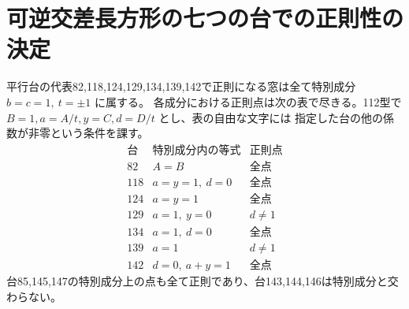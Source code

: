 \section{可逆交差長方形の七つの台での正則性の決定}
\label{sec:parallel-support-fibers}
\begin{theorem}\label{thm:parallel-support-fibers}
平行台の代表82,118,124,129,134,139,142で正則になる窓は全て特別成分 $b=c=1,\ t=\pm1$ に属する。
各成分における正則点は次の表で尽きる。112型で $B=1,a=A/t,y=C,d=D/t$ とし、表の自由な文字には
指定した台の他の係数が非零という条件を課す。
\[
\begin{array}{c|l|l}
 台&\text{特別成分内の等式}&\text{正則点}\\\hline
82&A=B&\text{全点}\\
118&a=y=1,\ d=0&\text{全点}\\
124&a=y=1&\text{全点}\\
129&a=1,\ y=0&d\ne1\\
134&a=1,\ d=0&\text{全点}\\
139&a=1&d\ne1\\
142&d=0,\ a+y=1&\text{全点}
\end{array}
\]
台85,145,147の特別成分上の点も全て正則であり、台143,144,146は特別成分と交わらない。
\end{theorem}
